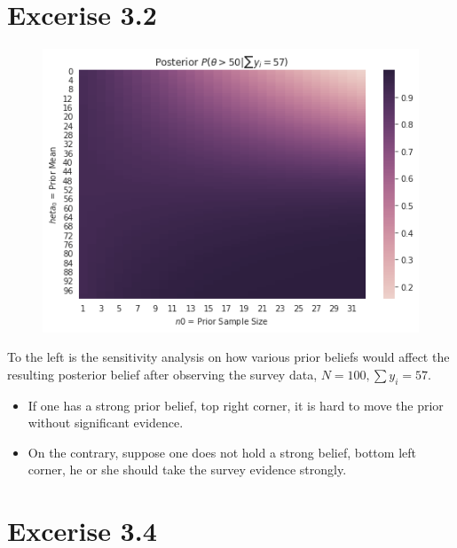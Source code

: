 \documentclass[11pt, letterpaper]{article}
\begin{document}
\section{Excerise 3.2}

\begin{figure}
    \begin{center}
        \includegraphics[scale=0.56]{hw2_3.2.png}
    \end{center}
\end{figure}

To the left is the sensitivity analysis on how various prior beliefs would affect the resulting posterior belief after
observing the survey data, $N=100, \sum y_i = 57$.
\begin{itemize}
    \item If one has a strong prior belief, top right corner, it is hard to move the prior without significant evidence.
    \item On the contrary, suppose one does not hold a strong belief, bottom left corner, he or she should take the survey evidence strongly.
\end{itemize}


\section{Excerise 3.4}
\end{document}
